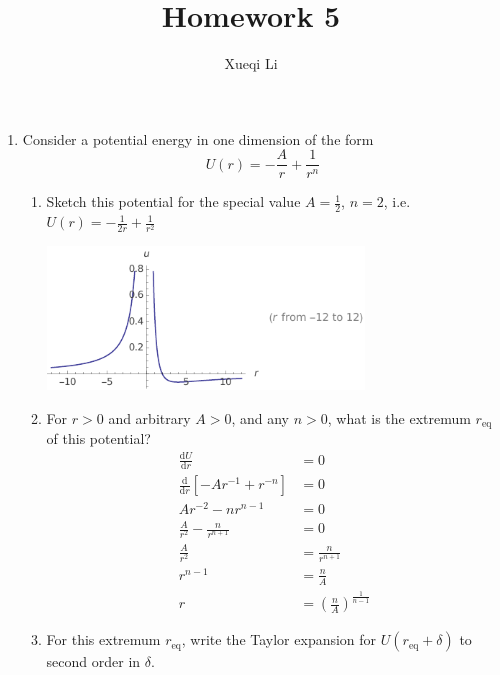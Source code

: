 \documentclass{article}
\newcommand{\de}{\mathrm{d}}
\begin{document}
\title{Homework 5}
\author{Xueqi Li}


\maketitle

\begin{enumerate}
    \item Consider a potential energy in one dimension of the form
    \[
        U(r) = -\frac{A}{r} + \frac{1}{r^n}
    \]
    \begin{enumerate}
        \item Sketch this potential for the special value $A = \frac{1}{2}$, $n = 2$, i.e. $U(r) = -\frac{1}{2r} + \frac{1}{r^2}$
        \begin{center}
            \includegraphics[height=1.5in]{plot.pdf}
        \end{center}

        \item For $r > 0$ and arbitrary $A > 0$, and any $n > 0$, what is the extremum $r_\text{eq}$ of this potential?\\

        \begin{align*}
            \frac{\de U}{\de r} &= 0\\
            \frac{\de }{\de r} \left[-A r^{-1} + r^{-n}\right] &= 0 \\
            A r^{-2} -n r^{n-1} &= 0\\
            \frac{A}{r^2} - \frac{n}{r^{n+1}} &= 0\\
            \frac{A}{r^2} &= \frac{n}{r^{n+1}} \\
            r^{n-1} &= \frac{n}{A}\\
            r &= \left(\frac{n}{A}\right)^{\frac{1}{n-1}}
        \end{align*}
        \item For this extremum $r_\text{eq}$, write the Taylor expansion for $U(r_\text{eq}+\delta)$ to second order in $\delta$.\\


\end{enumerate}
\end{enumerate}
\end{document}
